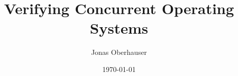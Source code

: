 \documentclass{beamer}
\title{Verifying Concurrent Operating Systems}
\author{Jonas Oberhauser}
\date{\today} %
\begin{document}
\begin{frame}
\titlepage %
\end{frame}


\end{document}
